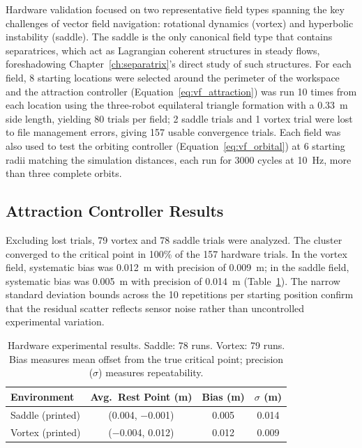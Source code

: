 \documentclass[12pt, letterpaper, oneside]{report}
\begin{document}
Hardware validation focused on two representative field types spanning the
key challenges of vector field navigation: rotational dynamics (vortex) and
hyperbolic instability (saddle). The saddle is the only canonical field
type that contains separatrices, which act as Lagrangian coherent
structures in steady flows, foreshadowing Chapter~\ref{ch:separatrix}'s
direct study of such structures. For each field, 8 starting locations were
selected around the perimeter of the workspace and the attraction
controller (Equation~\eqref{eq:vf_attraction}) was run 10 times from each
location using the three-robot equilateral triangle formation with a
0.33~m side length, yielding 80 trials per field; 2 saddle trials and 1
vortex trial were lost to file management errors, giving 157 usable
convergence trials. Each field was also used to test the orbiting
controller (Equation~\eqref{eq:vf_orbital}) at 6 starting radii matching
the simulation distances, each run for 3000 cycles at 10~Hz, more than
three complete orbits.

\subsection{Attraction Controller Results}

Excluding lost trials, 79 vortex and 78 saddle trials were analyzed. The
cluster converged to the critical point in 100\% of the 157 hardware
trials. In the vortex field, systematic bias was 0.012~m with precision of
0.009~m; in the saddle field, systematic bias was 0.005~m with precision of
0.014~m (Table~\ref{tab:estimation_results}). The narrow standard deviation
bounds across the 10 repetitions per starting position confirm that the
residual scatter reflects sensor noise rather than uncontrolled
experimental variation.

\begin{table}[!t]
\footnotesize
\centering
\caption{Hardware experimental results. Saddle: 78 runs. Vortex: 79 runs.
Bias measures mean offset from the true critical point; precision
($\sigma$) measures repeatability.}
\label{tab:estimation_results}
\begin{tabular}{lccc}
\toprule
\textbf{Environment} & \textbf{Avg.\ Rest Point (m)} & \textbf{Bias (m)} & \textbf{$\sigma$ (m)} \\
\midrule
Saddle (printed) & (0.004, $-$0.001) & 0.005 & 0.014 \\
Vortex (printed) & ($-$0.004, 0.012) & 0.012 & 0.009 \\
\bottomrule
\end{tabular}
\end{table}
\end{document}

